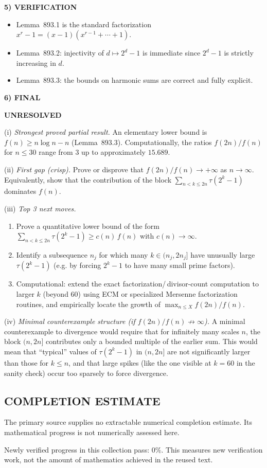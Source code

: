 \medskip
\noindent\textbf{5) VERIFICATION}

\begin{itemize}
\item Lemma~893.1 is the standard factorization $x^r-1=(x-1)(x^{r-1}+\cdots+1)$.
\item Lemma~893.2: injectivity of $d\mapsto 2^d-1$ is immediate since $2^d-1$ is
strictly increasing in $d$.
\item Lemma~893.3: the bounds on harmonic sums are correct and fully explicit.
\end{itemize}

\medskip
\noindent\textbf{6) FINAL}

\textbf{UNRESOLVED}

(i) \emph{Strongest proved partial result.}
An elementary lower bound is $f(n)\ge n\log n - n$ (Lemma~893.3).
Computationally, the ratios $f(2n)/f(n)$ for $n\le 30$ range from $3$ up to
approximately $15.689$.

(ii) \emph{First gap (crisp).}
Prove or disprove that $f(2n)/f(n)\to +\infty$ as $n\to\infty$.
Equivalently, show that the contribution of the block $\sum_{n<k\le 2n}\tau(2^k-1)$
dominates $f(n)$.

(iii) \emph{Top 3 next moves.}
\begin{enumerate}
\item Prove a quantitative lower bound of the form
$\sum_{n<k\le 2n}\tau(2^k-1) \ge c(n)\, f(n)$ with $c(n)\to\infty$.
\item Identify a subsequence $n_j$ for which many $k\in(n_j,2n_j]$ have unusually
large $\tau(2^k-1)$ (e.g. by forcing $2^k-1$ to have many small prime factors).
\item Computational: extend the exact factorization/\,divisor-count computation to
larger $k$ (beyond 60) using ECM or specialized Mersenne factorization routines,
and empirically locate the growth of $\max_{n\le X} f(2n)/f(n)$.
\end{enumerate}

(iv) \emph{Minimal counterexample structure (if $f(2n)/f(n)\not\to\infty$).}
A minimal counterexample to divergence would require that for infinitely many
scales $n$, the block $(n,2n]$ contributes only a bounded multiple of the earlier
sum. This would mean that “typical” values of $\tau(2^k-1)$ in $(n,2n]$ are not
significantly larger than those for $k\le n$, and that large spikes (like the one
visible at $k=60$ in the sanity check) occur too sparsely to force divergence.




\subsection*{COMPLETION ESTIMATE}
The primary source supplies no extractable numerical completion estimate. Its mathematical progress is not numerically assessed here.

Newly verified progress in this collection pass: $0\%$. This measures new verification work, not the amount of mathematics achieved in the reused text.
